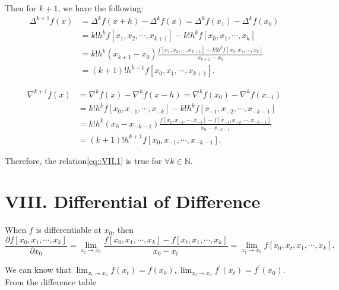 \documentclass[a4paper]{article}
\begin{document}
Then for $k+1$, we have the following:
\begin{equation}
  \begin{aligned}
    \Delta^{k+1} f(x) &= \Delta^k f(x+h) - \Delta^k f(x) = \Delta^k f(x_1) - \Delta^k f(x_0) \\
    &= k! h^k f[x_1, x_2, \cdots, x_{k+1}] - k! h^k f[x_0, x_1, \cdots, x_k] \\
    &= k! h^k (x_{k+1} - x_0) \frac{f[x_1, x_2, \cdots, x_{k+1}] - k! h^k f[x_0, x_1, \cdots, x_k]}{x_{k+1} - x_0} \\
    &= (k+1)! h^{k+1} f[x_0, x_1, \cdots, x_{k+1}].
  \end{aligned}
\end{equation}

\begin{equation}
  \begin{aligned}
    \nabla^{k+1} f(x) &= \nabla^k f(x) - \nabla^k f(x-h) = \nabla^k f(x_0) - \nabla^k f(x_{-1}) \\
    &= k! h^{k} f[x_0, x_{-1}, \cdots, x_{-k}] - k! h^{k} f[x_{-1}, x_{-2}, \cdots, x_{-k-1}] \\
    &= k! h^{k} (x_0 - x_{-k-1}) \frac{f[x_0, x_{-1}, \cdots, x_{-k}] - f[x_{-1}, x_{-2}, \cdots, x_{-k-1}]}{x_0 - x_{-k-1}} \\
    &= (k+1)! h^{k+1} f[x_0, x_{-1}, \cdots, x_{-k-1}].
  \end{aligned}
\end{equation}

Therefore, the relation\eqref{eq::VII.1} is true for $\forall k \in \mathbb{N}$.

\section*{VIII. Differential of Difference}
When $f$ is differentiable at $x_0$, then 
\begin{equation}
  \frac{\partial f[x_0, x_1, \cdots, x_k]}{\partial x_0} = \lim_{x_t \rightarrow x_0}\frac{f[x_0, x_1, \cdots, x_k] - f[x_t, x_1, \cdots, x_k]}{x_0 - x_t} = \lim_{x_t\rightarrow x_0} f[x_0, x_t, x_1, \cdots, x_k].
\end{equation}

We can know that $\lim_{x_t \rightarrow x_0} f(x_t) = f(x_0), \lim_{x_t \rightarrow x_0} f^{\prime}(x_t) = f^{\prime} (x_0)$. From the difference table 
\end{document}
